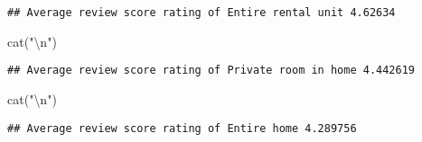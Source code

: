 \documentclass[
]{article}
\newenvironment{Shaded}{\begin{snugshade}}{\end{snugshade}}
\newcommand{\FunctionTok}[1]{\textcolor[rgb]{0.00,0.00,0.00}{#1}}
\newcommand{\NormalTok}[1]{#1}
\newcommand{\OtherTok}[1]{\textcolor[rgb]{0.56,0.35,0.01}{#1}}
\newcommand{\SpecialCharTok}[1]{\textcolor[rgb]{0.00,0.00,0.00}{#1}}
\newcommand{\StringTok}[1]{\textcolor[rgb]{0.31,0.60,0.02}{#1}}
\begin{document}
\begin{verbatim}
## Average review score rating of Entire rental unit 4.62634
\end{verbatim}

\begin{Shaded}
\begin{Highlighting}[]
\FunctionTok{cat}\NormalTok{(}\StringTok{"}\SpecialCharTok{\textbackslash{}n}\StringTok{"}\NormalTok{)}
\end{Highlighting}
\end{Shaded}

\begin{Shaded}
\end{Shaded}

\begin{verbatim}
## Average review score rating of Private room in home 4.442619
\end{verbatim}

\begin{Shaded}
\begin{Highlighting}[]
\FunctionTok{cat}\NormalTok{(}\StringTok{"}\SpecialCharTok{\textbackslash{}n}\StringTok{"}\NormalTok{)}
\end{Highlighting}
\end{Shaded}

\begin{Shaded}
\end{Shaded}

\begin{verbatim}
## Average review score rating of Entire home 4.289756
\end{verbatim}
\end{document}
